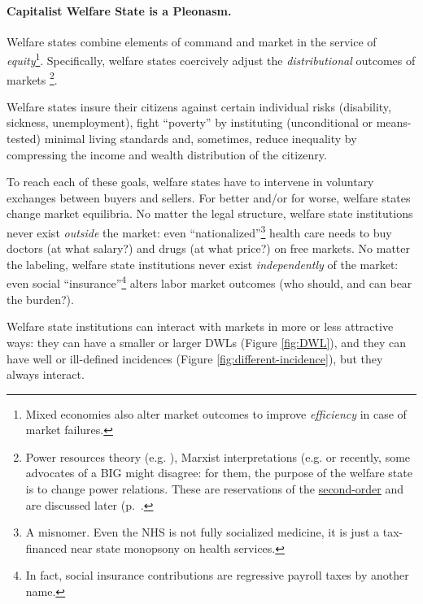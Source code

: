 \paragraph{Capitalist Welfare State is a Pleonasm.}  \label{sec:interface} Welfare states combine elements of  command and market in the service of \emph{equity}\footnote
	{Mixed economies also alter market outcomes to improve \emph{efficiency} in case of market failures.}. 
Specifically, welfare states coercively adjust the \emph{distributional} outcomes of markets \footnote
	{Power resources theory (e.g. \citealt{Korpi2003}), Marxist interpretations (e.g. \cite{Offe1972} or recently, some advocates of a \gls{BIG} might disagree: for them, the purpose of the welfare state is to change power relations. These are reservations of the \hyperref[sec:who-dunnit]{second-order} and are discussed later (p.~\pageref{sec:who-dunnit}.}.

Welfare states insure their citizens against certain individual risks (disability, sickness, unemployment), fight ``poverty'' by instituting (unconditional or means-tested) minimal living standards and, sometimes, reduce inequality by compressing the income and wealth distribution of the citizenry.

To reach each of these goals, welfare states have to intervene in voluntary exchanges between buyers and sellers. For better and/or for worse, welfare states change market equilibria. No matter the legal structure, welfare state institutions never exist \emph{outside} the market: even ``nationalized''\footnote
	{A misnomer. Even the \gls{NHS} is not fully socialized medicine, it is just a tax-financed near state monopsony on health services.} 
health care needs to buy doctors (at what salary?) and drugs (at what price?) on free markets. No matter the labeling, welfare state institutions never exist \emph{independently} of the market: even social ``insurance''\footnote
	{In fact, social insurance contributions are regressive payroll taxes by another name.} alters labor market outcomes (who should, and can bear the burden?). 

Welfare state institutions can interact with markets in more or less attractive ways: they can have a smaller or larger \glspl{DWL} (Figure \ref{fig:DWL}), and they can have well or ill-defined incidences (Figure \ref{fig:different-incidence}), but they always interact.%

